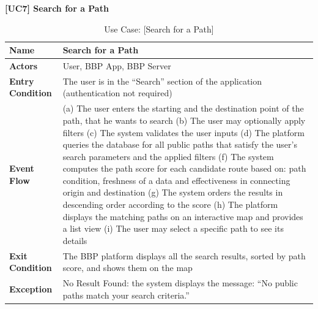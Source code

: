 \begin{table}[H]
    \centering
    \raggedright \textbf{\large [UC7] Search for a Path} \\[0.2cm]
    \renewcommand{\arraystretch}{1.5}
    
    \begin{tabularx}{\textwidth}{|l|X|}
        \hline
        
        \textbf{Name} & \textbf{Search for a Path} \\ \hline
        
        \textbf{Actors} & User, BBP App, BBP Server \\ \hline
        
        \textbf{Entry Condition} & The user is in the “Search” section of the application (authentication not required) \\ \hline
        
        \textbf{Event Flow} & 
        (a) The user enters the starting and the destination point of the path, that he wants to search \newline
        (b) The user may optionally apply filters \newline
        (c) The system validates the user inputs \newline
        (d) The platform queries the database for all public paths that satisfy the user’s search parameters and the applied filters \newline
        (f) The system computes the path score for each candidate route based on: path condition, freshness of a data and effectiveness in connecting origin and destination\newline                                                              
        (g) The system orders the results in descending order according to the score \newline       
        (h) The platform displays the matching paths on an interactive map and provides a list view \newline
        (i) The user may select a specific path to see its details
        \\ \hline

        \textbf{Exit Condition} & The BBP platform displays all the search results, sorted by path score, and shows them on the map \\ \hline
        
        \textbf{Exception} & No Result Found: the system displays the message: “No public paths match your search criteria.”  \\ \hline
        
    \end{tabularx}

    \caption{Use Case: [Search for a Path]}
    \label{tab:usecase_id}
\end{table}

